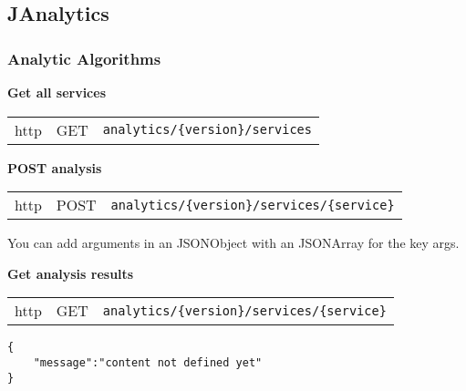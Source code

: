 %
\subsection{JAnalytics} %
\label{subsec:JAnalytics}

	\subsubsection{Analytic Algorithms}
	
	\textbf{Get all services}\\
			\begin{tabular}{lll}
				http & GET & \texttt{analytics/\{version\}/services}
			\end{tabular}
	
	\textbf{POST analysis}\\
			\begin{tabular}{lll}
				http & POST & \texttt{analytics/\{version\}/services/\{service\}}
			\end{tabular}
			You can add arguments in an JSONObject with an JSONArray for the key args.

	\textbf{Get analysis results}\\
			\begin{tabular}{lll}
				http & GET & \texttt{analytics/\{version\}/services/\{service\}}
			\end{tabular}
		\begin{flushleft}
			\begin{lstlisting}
{
    "message":"content not defined yet"
}

			\end{lstlisting}
		\end{flushleft}
